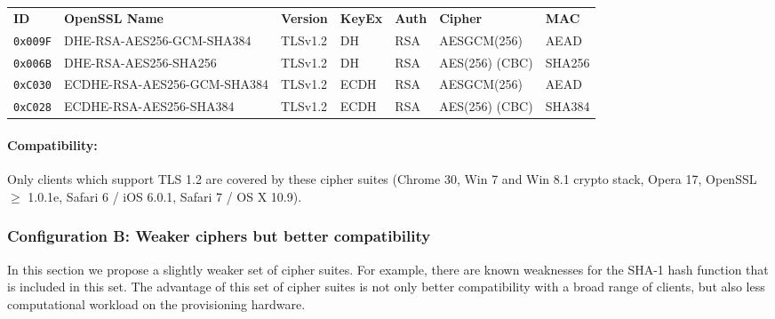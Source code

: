 %



\begin{center}

\begin{tabular}{lllllll}
\toprule
\textbf{ID}   & \textbf{OpenSSL Name}       & \textbf{Version} & \textbf{KeyEx} & \textbf{Auth} & \textbf{Cipher} & \textbf{MAC}\\\cmidrule(lr){1-7}
\verb|0x009F| & DHE-RSA-AES256-GCM-SHA384   & TLSv1.2          & DH             &  RSA          & AESGCM(256)     & AEAD         \\
\verb|0x006B| & DHE-RSA-AES256-SHA256       & TLSv1.2          & DH             &  RSA          & AES(256) (CBC)  & SHA256       \\
\verb|0xC030| & ECDHE-RSA-AES256-GCM-SHA384 & TLSv1.2          & ECDH           &  RSA          & AESGCM(256)     & AEAD         \\
\verb|0xC028| & ECDHE-RSA-AES256-SHA384     & TLSv1.2          & ECDH           &  RSA          & AES(256) (CBC)  & SHA384       \\
\bottomrule
\end{tabular}
\end{center}


\paragraph*{Compatibility:}

Only clients which support TLS 1.2 are covered by these cipher suites (Chrome 30,
Win 7 and Win 8.1 crypto stack, Opera 17, OpenSSL $\ge$ 1.0.1e, Safari 6 / iOS
6.0.1, Safari 7 / OS X 10.9).



\subsubsection{Configuration B: Weaker ciphers but better compatibility}

In this section we propose a slightly weaker set of cipher suites.  For
example, there are known weaknesses for the SHA-1 hash function that is
included in this set.  The advantage of this set of cipher suites is not only
better compatibility with a broad range of clients, but also less computational
workload on the provisioning hardware.
\\

